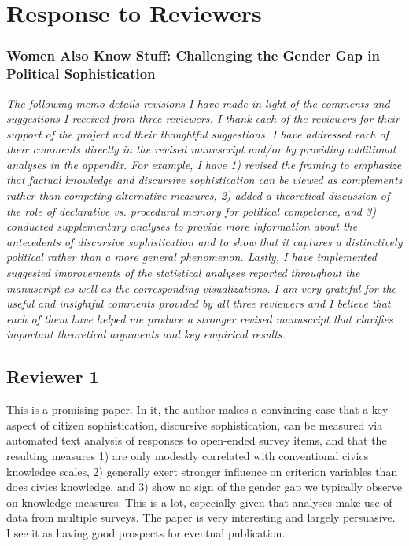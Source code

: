 \clearpage
\singlespacing
\setcounter{page}{1}
\setcounter{footnote}{0}
\setlength{\parskip}{1em}
\setlength{\parindent}{0cm}
\section*{Response to Reviewers}
\subsubsection*{Women Also Know Stuff: Challenging the Gender Gap in Political Sophistication}
\startcontents[memo]

\textit{The following memo details revisions I have made in light of the comments and suggestions I received from three reviewers.  I thank each of the reviewers for their support of the project and their thoughtful suggestions. I have addressed each of their comments directly in the revised manuscript and/or by providing additional analyses in the appendix.  For example, I have 1) revised the framing to emphasize that factual knowledge and discursive sophistication can be viewed as complements rather than competing alternative measures, 2) added a theoretical discussion of the role of declarative vs. procedural memory for political competence, and 3) conducted supplementary analyses to provide more information about the antecedents of discursive sophistication and to show that it captures a distinctively {\normalfont political} rather than a more {\normalfont general} phenomenon. Lastly, I have implemented suggested improvements of the statistical analyses reported throughout the manuscript as well as the corresponding visualizations. I am very grateful for the useful and insightful comments provided by all three reviewers and I believe that each of them have helped me produce a stronger revised manuscript that clarifies important theoretical arguments and key empirical results.}



\subsection*{Reviewer 1}

This is a promising paper. In it, the author makes a convincing case that a key aspect of citizen sophistication, discursive sophistication, can be measured via automated text analysis of responses to open-ended survey items, and that the resulting measures 1) are only modestly correlated with conventional civics knowledge scales, 2) generally exert stronger influence on criterion variables than does civics knowledge, and 3) show no sign of the gender gap we typically observe on knowledge measures. This is a lot, especially given that analyses make use of data from multiple surveys. The paper is very interesting and largely persuasive. I see it as having good prospects for eventual publication.

